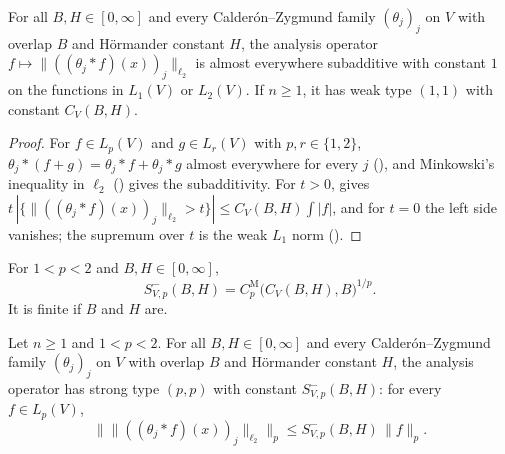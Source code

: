 \begin{lemma}
\label{lem:analysis-subadditive-weak-type}
\leanok
{}
For all $B, H \in [0, \infty]$ and every Calder\'on--Zygmund family $(\theta_j)_j$ on $V$ with
overlap $B$ and H\"ormander constant $H$, the analysis operator
$f \mapsto \|((\theta_j * f)(x))_j\|_{\ell_2}$ is almost everywhere subadditive with constant
$1$ on the functions in $L_1(V)$ or $L_2(V)$. If $n \geq 1$, it has weak type $(1, 1)$ with
constant $C_V(B, H)$.
\end{lemma}

\begin{proof}
\leanok
For $f \in L_p(V)$ and $g \in L_r(V)$ with $p, r \in \{1, 2\}$,
$\theta_j * (f + g) = \theta_j * f + \theta_j * g$ almost everywhere for every $j$
(), and Minkowski's inequality in $\ell_2$ () gives the
subadditivity. For $t > 0$,  gives
$t \, |\{\|((\theta_j * f)(x))_j\|_{\ell_2} > t\}| \leq C_V(B, H) \int |f|$, and for $t = 0$
the left side vanishes; the supremum over $t$ is the weak $L_1$ norm
().
\end{proof}

\begin{definition}
\label{def:cz-const-below}
\leanok
{}
For $1 < p < 2$ and $B, H \in [0, \infty]$,
\[
  S^-_{V,p}(B, H) = C^{\mathrm M}_p\bigl(C_V(B, H), B\bigr)^{1/p} .
\]
It is finite if $B$ and $H$ are.
\end{definition}

\begin{theorem}
\label{thm:cz-analysis-below-two}
\leanok
{}
Let $n \geq 1$ and $1 < p < 2$. For all $B, H \in [0, \infty]$ and every Calder\'on--Zygmund
family $(\theta_j)_j$ on $V$ with overlap $B$ and H\"ormander constant $H$, the analysis
operator has strong type $(p, p)$ with constant $S^-_{V,p}(B, H)$: for every $f \in L_p(V)$,
\[
  \bigl\| \|((\theta_j * f)(x))_j\|_{\ell_2} \bigr\|_p \leq S^-_{V,p}(B, H) \, \|f\|_p .
\]
\end{theorem}

